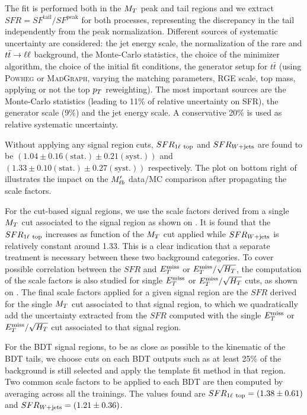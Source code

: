     The fit is performed both in the $M_T$ peak and tail regions and we extract
    $SFR = SF^{\text{tail}} / SF^{\text{peak}}$ for both processes, representing
    the discrepancy in the tail independently from the peak normalization.
    Different sources of systematic uncertainty are considered: the jet energy
    scale, the normalization of the rare and $t\bar{t} \rightarrow \ell \ell$ background, the
    Monte-Carlo statistics, the choice of the minimizer algorithm, the choice of
    the initial fit conditions, the generator setup for $t\bar{t}$ (using
    \textsc{Powheg} or \textsc{MadGraph}, varying the matching parameters, RGE
    scale, top mass, applying or not the top $p_T$ reweighting). The most
    important sources are the Monte-Carlo statistics (leading to 11\% of
    relative uncertainty on SFR), the generator scale (9\%) and the jet energy
    scale. A conservative 20\% is used as relative systematic uncertainty.

    Without applying any signal region cuts, $SFR_{1\ell~\text{top}}$ and $SFR_{\text{$W$+jets}}$
    are found to be $(1.04 \pm 0.16 (\text{stat.}) \pm 0.21 (\text{syst.}))$ and
    $(1.33 \pm 0.10 (\text{stat.}) \pm 0.27 (\text{syst.}) )$ respectively. The
    plot on bottom right of  illustrates the
    impact on the $M'_{\ell b}$ data/MC comparison after propagating the scale
    factors.

    For the cut-based signal regions, we use the scale factors derived from a
    single $M_T$ cut associated to the signal region as shown on
    . It is found that the $SFR_{1\ell~\text{top}}$
    increases as function of the $M_T$ cut applied while $SFR_{\text{$W$+jets}}$ is
    relatively constant around 1.33. This is a clear indication that a separate
    treatment is necessary between these two background categories. To cover
    possible correlation between the $SFR$ and $E_T^\text{miss}$ or $E_T^\text{miss}/\sqrt{H_T}$, the
    computation of the scale factors is also studied for single $E_T^\text{miss}$ or
    $E_T^\text{miss}/\sqrt{H_T}$ cuts, as shown on .
    The final scale factors applied for a given signal region are the $SFR$
    derived for the single $M_T$ cut associated to that signal region, to which
    we quadratically add the uncertainty extracted from the $SFR$ computed with
    the single $E_T^\text{miss}$ or $E_T^\text{miss}/\sqrt{H_T}$ cut associated to that signal region.

    For the BDT signal regions, to be as close as possible to the kinematic of
    the BDT tails, we choose cuts on each BDT outputs such as at least 25\% of
    the background is still selected and apply the template fit method in that
    region. Two common scale factors to be applied to each BDT are then computed
    by averaging across all the trainings.  The values found are
    $SFR_{1\ell~\text{top}} = (1.38 \pm 0.61)$ and $SFR_{\text{$W$+jets}} = (1.21 \pm 0.36)$.

